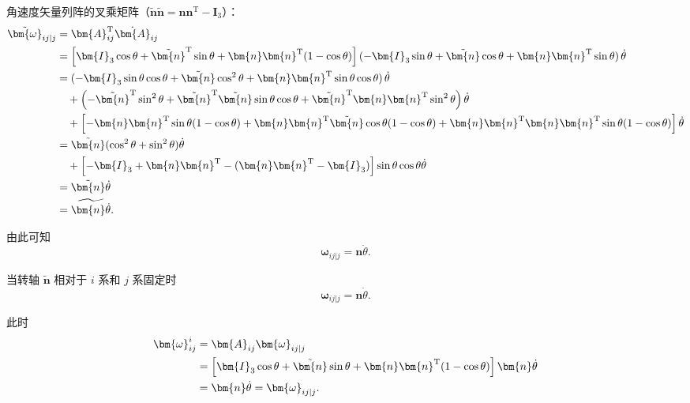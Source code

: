 角速度矢量列阵的叉乘矩阵（$\tilde{\bm{n}}\tilde{\bm{n}} = \bm{n}\bm{n}^{\mathrm{T}} - \bm{I}_3$）：
\begin{align}
    \tilde{\bm{\omega}}_{ij|j} &= \bm{A}_{ij}^{\mathrm{T}}\dot{\bm{A}}_{ij}\notag\\
    &= \left[\bm{I}_3\cos\theta + \tilde{\bm{n}}^{\mathrm{T}}\sin\theta + \bm{n}\bm{n}^{\mathrm{T}}(1-\cos\theta)\right](-\bm{I}_3\sin\theta + \tilde{\bm{n}}\cos\theta + \bm{n}\bm{n}^{\mathrm{T}}\sin\theta)\,\dot{\theta}\notag\\
    &= (-\bm{I}_3\sin\theta\cos\theta + \tilde{\bm{n}}\cos^2\theta + \bm{n}\bm{n}^{\mathrm{T}}\sin\theta\cos\theta)\,\dot{\theta}\notag\\
    &\quad + \left(-\tilde{\bm{n}}^{\mathrm{T}}\sin^2\theta + \tilde{\bm{n}}^{\mathrm{T}}\tilde{\bm{n}}\sin\theta\cos\theta + \tilde{\bm{n}}^{\mathrm{T}}\bm{n}\bm{n}^{\mathrm{T}}\sin^2\theta\right)\dot{\theta}\notag\\
    &\quad + \left[-\bm{n}\bm{n}^{\mathrm{T}}\sin\theta(1-\cos\theta) + \bm{n}\bm{n}^{\mathrm{T}}\tilde{\bm{n}}\cos\theta(1-\cos\theta) + \bm{n}\bm{n}^{\mathrm{T}}\bm{n}\bm{n}^{\mathrm{T}}\sin\theta(1-\cos\theta)\right]\dot{\theta}\notag\\
    &= \tilde{\bm{n}}(\cos^2\theta + \sin^2\theta)\dot{\theta}\notag\\
    &\quad + \left[-\bm{I}_3 + \bm{n}\bm{n}^{\mathrm{T}} - (\bm{n}\bm{n}^{\mathrm{T}} - \bm{I}_3)\right]\sin\theta\cos\theta\dot{\theta}\notag\\
    &= \tilde{\bm{n}}\dot{\theta}\notag\\
    &= \widetilde{\bm{n}\dot{\theta}}.
\end{align}

由此可知
\begin{equation}
    \bm{\omega}_{ij|j} = \bm{n}\dot{\theta}.
\end{equation}

当转轴 $\tilde{\bm{n}}$ 相对于 $i$ 系和 $j$ 系固定时
\begin{equation}
    \bm{\omega}_{ij|j} = \bm{n}\dot{\theta}.
\end{equation}

此时
\begin{align}
    \bm{\omega}_{ij}^i &= \bm{A}_{ij}\bm{\omega}_{ij|j}\notag\\
    &= \left[\bm{I}_3\cos\theta + \tilde{\bm{n}}\sin\theta + \bm{n}\bm{n}^{\mathrm{T}}(1-\cos\theta)\right]\bm{n}\dot{\theta}\notag\\
    &= \bm{n}\dot{\theta} = \bm{\omega}_{ij|j}.
\end{align}

